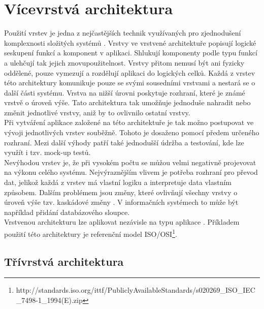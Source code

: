 \documentclass[ing,male,java,dept456]{diploma}						%
\begin{document}
\section{Vícevrstvá architektura}
\label{sec:Layers}

Použití vrstev je jedna z nejčastějších technik využívaných pro zjednodušení komplexnosti složitých systémů \cite{fowler}. Vrstvy ve vrstvené architektuře popisují logické seskupení funkcí a komponent v aplikaci. Shlukují komponenty podle typu funkcí a ulehčují tak jejich znovupoužitelnost. Vrstvy přitom nemusí být ani fyzicky oddělené, pouze vymezují a rozdělují aplikaci do logických celků. Každá z vrstev této architektury komunikuje pouze se svými sousedními vrstvami a nestará se o další části systému. Vrstva na nižší úrovni poskytuje rozhraní, které je známé vrstvě o úroveň výše. Tato architektura tak umožňuje jednoduše nahradit nebo změnit jednotlivé vrstvy, aniž by to ovlivnilo ostatní vrstvy. \\
Při vytváření aplikace založené na této architektuře je tak možno postupovat ve vývoji jednotlivých vrstev souběžně. Tohoto je dosaženo pomocí předem určeného rozhraní. Mezi další výhody patří také jednodušší údržba a testování, kde lze využít i tzv. mock-up testů. \\
Nevýhodou vrstev je, že při vysokém počtu se můžou velmi negativně projevovat na výkonu celého systému. Nejvýraznějším vlivem je potřeba rozhraní pro převod dat, jelikož každá z vrstev má vlastní logiku a interpretuje data vlastním způsobem. Dalším problémem jsou změny, které ovlivňují všechny vrstvy o úroveň výše tzv. kaskádové změny \cite{dresler}. V informačních systémech to může být například přidání databázového sloupce. \\
Vrstvenou architekturu lze aplikovat nezávisle na typu aplikace \cite{msdn}. Příkladem použití této architektury je referenční model ISO/OSI\footnote{ http://standards.iso.org/ittf/PubliclyAvailableStandards/s020269\_ISO\_IEC\_7498-1\_1994(E).zip}. \\

\subsection{Třívrstvá architektura}
\end{document}
